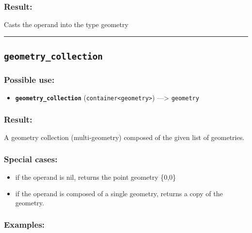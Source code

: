 \documentclass[]{book}
\providecommand{\tightlist}{%
  \setlength{\itemsep}{0pt}\setlength{\parskip}{0pt}}
\theoremstyle{definition}
\theoremstyle{definition}
\theoremstyle{definition}
\theoremstyle{remark}
\begin{document}
\subsubsection{Result:}\label{result-185}

Casts the operand into the type geometry

\begin{center}\rule{0.5\linewidth}{\linethickness}\end{center}

\subsection{\texorpdfstring{\texttt{geometry\_collection}}{geometry\_collection}}\label{geometry_collection}

\subsubsection{Possible use:}\label{possible-use-192}

\begin{itemize}
\tightlist
\item
  \textbf{\texttt{geometry\_collection}}
  (\texttt{container\textless{}geometry\textgreater{}})
  ---\textgreater{} \texttt{geometry}
\end{itemize}

\subsubsection{Result:}\label{result-186}

A geometry collection (multi-geometry) composed of the given list of
geometries.

\subsubsection{Special cases:}\label{special-cases-70}

\begin{itemize}
\tightlist
\item
  if the operand is nil, returns the point geometry \{0,0\}\\
\item
  if the operand is composed of a single geometry, returns a copy of the
  geometry.
\end{itemize}

\subsubsection{Examples:}\label{examples-140}
\end{document}
